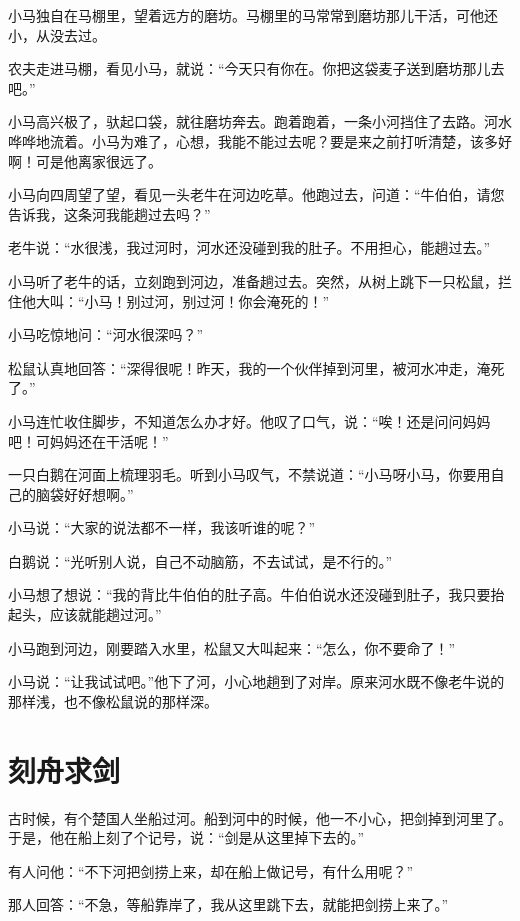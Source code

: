 \documentclass[12pt,UTF-8,openany]{ctexbook}
\begin{document}
\begin{large}
    
    小马独自在马棚里，望着远方的磨坊。马棚里的马常常到磨坊那儿干活，可他还小，从没去过。
    
    农夫走进马棚，看见小马，就说：“今天只有你在。你把这袋麦子送到磨坊那儿去吧。”
    
    小马高兴极了，驮起口袋，就往磨坊奔去。跑着跑着，一条小河挡住了去路。河水哗哗地流着。小马为难了，心想，我能不能过去呢？要是来之前打听清楚，该多好啊！可是他离家很远了。
    
    小马向四周望了望，看见一头老牛在河边吃草。他跑过去，问道：“牛伯伯，请您告诉我，这条河我能趟过去吗？”
    
    老牛说：“水很浅，我过河时，河水还没碰到我的肚子。不用担心，能趟过去。”
    
    小马听了老牛的话，立刻跑到河边，准备趟过去。突然，从树上跳下一只松鼠，拦住他大叫：“小马！别过河，别过河！你会淹死的！”
    
    小马吃惊地问：“河水很深吗？”
    
    松鼠认真地回答：“深得很呢！昨天，我的一个伙伴掉到河里，被河水冲走，淹死了。”
    
    小马连忙收住脚步，不知道怎么办才好。他叹了口气，说：“唉！还是问问妈妈吧！可妈妈还在干活呢！”
    
    一只白鹅在河面上梳理羽毛。听到小马叹气，不禁说道：“小马呀小马，你要用自己的脑袋好好想啊。”
    
    小马说：“大家的说法都不一样，我该听谁的呢？”
    
    白鹅说：“光听别人说，自己不动脑筋，不去试试，是不行的。”
    
    小马想了想说：“我的背比牛伯伯的肚子高。牛伯伯说水还没碰到肚子，我只要抬起头，应该就能趟过河。”
    
    小马跑到河边，刚要踏入水里，松鼠又大叫起来：“怎么，你不要命了！”
    
    小马说：“让我试试吧。”他下了河，小心地趟到了对岸。原来河水既不像老牛说的那样浅，也不像松鼠说的那样深。
    
\end{large}



\chapter{刻舟求剑}

\begin{large}
    
    古时候，有个楚国人坐船过河。船到河中的时候，他一不小心，把剑掉到河里了。于是，他在船上刻了个记号，说：“剑是从这里掉下去的。”
    
    有人问他：“不下河把剑捞上来，却在船上做记号，有什么用呢？”
    
    那人回答：“不急，等船靠岸了，我从这里跳下去，就能把剑捞上来了。”
    
\end{large}
\end{document}
